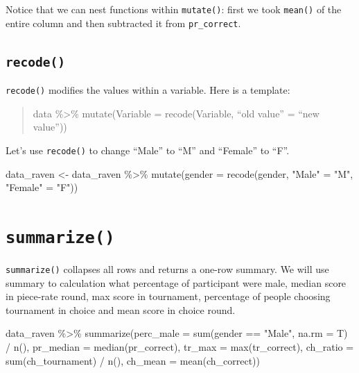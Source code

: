 \documentclass[
  letterpaper,
]{book}
\newenvironment{Shaded}{\begin{snugshade}}{\end{snugshade}}
\newcommand{\AttributeTok}[1]{\textcolor[rgb]{0.40,0.45,0.13}{#1}}
\newcommand{\FunctionTok}[1]{\textcolor[rgb]{0.28,0.35,0.67}{#1}}
\newcommand{\NormalTok}[1]{\textcolor[rgb]{0.00,0.23,0.31}{#1}}
\newcommand{\OtherTok}[1]{\textcolor[rgb]{0.00,0.23,0.31}{#1}}
\newcommand{\SpecialCharTok}[1]{\textcolor[rgb]{0.37,0.37,0.37}{#1}}
\newcommand{\StringTok}[1]{\textcolor[rgb]{0.13,0.47,0.30}{#1}}
\begin{document}
Notice that we can nest functions within \texttt{mutate()}: first we
took \texttt{mean()} of the entire column and then subtracted it from
\texttt{pr\_correct}.

\hypertarget{recode}{%
\subsection{\texorpdfstring{\texttt{recode()}}{recode()}}\label{recode}}

\texttt{recode()} modifies the values within a variable. Here is a
template:

\begin{quote}
data \%\textgreater\% mutate(Variable = recode(Variable, ``old value'' =
``new value''))
\end{quote}

Let's use \texttt{recode()} to change ``Male'' to ``M'' and ``Female''
to ``F''.

\begin{Shaded}
\begin{Highlighting}[]
\NormalTok{data\_raven }\OtherTok{\textless{}{-}}\NormalTok{ data\_raven }\SpecialCharTok{\%\textgreater{}\%} \FunctionTok{mutate}\NormalTok{(}\AttributeTok{gender =} \FunctionTok{recode}\NormalTok{(gender, }\StringTok{"Male"} \OtherTok{=} \StringTok{"M"}\NormalTok{, }\StringTok{"Female"} \OtherTok{=} \StringTok{"F"}\NormalTok{))}
\end{Highlighting}
\end{Shaded}

\hypertarget{summarize}{%
\section{\texorpdfstring{\texttt{summarize()}}{summarize()}}\label{summarize}}

\texttt{summarize()} collapses all rows and returns a one-row summary.
We will use summary to calculation what percentage of participant were
male, median score in piece-rate round, max score in tournament,
percentage of people choosing tournament in choice and mean score in
choice round.

\begin{Shaded}
\begin{Highlighting}[]
\NormalTok{data\_raven }\SpecialCharTok{\%\textgreater{}\%} 
  \FunctionTok{summarize}\NormalTok{(}\AttributeTok{perc\_male =} \FunctionTok{sum}\NormalTok{(gender }\SpecialCharTok{==} \StringTok{"Male"}\NormalTok{, }\AttributeTok{na.rm =}\NormalTok{ T) }\SpecialCharTok{/} \FunctionTok{n}\NormalTok{(),}
            \AttributeTok{pr\_median =} \FunctionTok{median}\NormalTok{(pr\_correct),}
            \AttributeTok{tr\_max =} \FunctionTok{max}\NormalTok{(tr\_correct),}
            \AttributeTok{ch\_ratio =} \FunctionTok{sum}\NormalTok{(ch\_tournament) }\SpecialCharTok{/} \FunctionTok{n}\NormalTok{(),}
            \AttributeTok{ch\_mean =} \FunctionTok{mean}\NormalTok{(ch\_correct))}
\end{Highlighting}
\end{Shaded}
\end{document}
